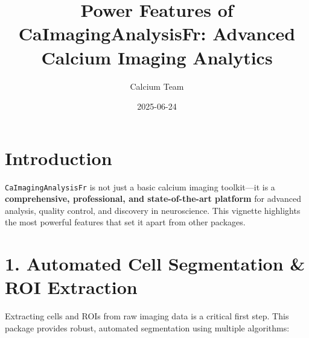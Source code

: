 \documentclass[
]{article}
\title{Power Features of CaImagingAnalysisFr: Advanced Calcium Imaging
Analytics}
\author{Calcium Team}
\date{2025-06-24}
\begin{document}
\maketitle

\section{Introduction}\label{introduction}

\texttt{CaImagingAnalysisFr} is not just a basic calcium imaging
toolkit---it is a \textbf{comprehensive, professional, and
state-of-the-art platform} for advanced analysis, quality control, and
discovery in neuroscience. This vignette highlights the most powerful
features that set it apart from other packages.

\section{1. Automated Cell Segmentation \& ROI
Extraction}\label{automated-cell-segmentation-roi-extraction}

Extracting cells and ROIs from raw imaging data is a critical first
step. This package provides robust, automated segmentation using
multiple algorithms:
\end{document}
